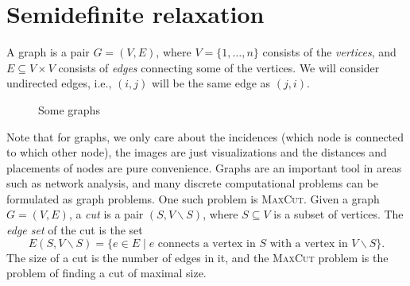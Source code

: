 \section{Semidefinite relaxation}
A graph is a pair $G=(V,E)$, where $V=\{1,\dots,n\}$ consists of the {\em vertices}, and $E\subseteq V\times V$ consists of {\em edges} connecting some of the vertices. We will consider undirected edges, i.e., $(i,j)$ will be the same edge as $(j,i)$. 
\begin{figure}[h!]
\centering
{}
\caption{Some graphs}
\end{figure}

Note that for graphs, we only care about the incidences (which node is connected to which other node), the images are just visualizations and the distances and placements of nodes are pure convenience.
Graphs are an important tool in areas such as network analysis, and many discrete computational problems can be formulated as graph problems. One such problem is \textsc{MaxCut}. Given a graph $G=(V,E)$, a {\em cut} is a pair $(S,V\backslash S)$, where $S\subseteq V$ is a subset of vertices. The {\em edge set} of the cut is the set
\begin{equation*}
 E(S,V\backslash S) = \{e\in E\mid e \text{ connects a vertex in } S \text{ with a vertex in } V\backslash S\}.
\end{equation*}
The size of a cut is the number of edges in it, and the \textsc{MaxCut} problem is the problem of finding a cut of maximal size. 

